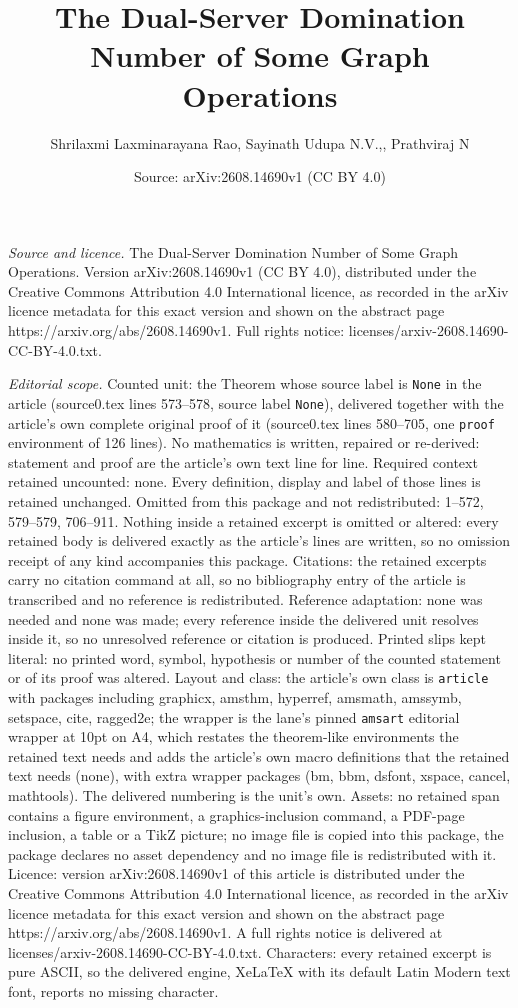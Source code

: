 \documentclass[10pt,a4paper]{amsart}
\title[The Dual-Server Domination Number of Some Graph Operations]{The Dual-Server Domination Number of Some Graph Operations}
\author{Shrilaxmi Laxminarayana Rao, Sayinath Udupa N.V.,, Prathviraj N}
\date{Source: arXiv:2608.14690v1 (CC BY 4.0)}
\begin{document}
\maketitle

\noindent\emph{Source and licence.} The Dual-Server Domination Number of Some Graph Operations. Version arXiv:2608.14690v1 (CC BY 4.0), distributed under the Creative Commons Attribution 4.0 International licence, as recorded in the arXiv licence metadata for this exact version and shown on the abstract page https://arxiv.org/abs/2608.14690v1. Full rights notice: licenses/arxiv-2608.14690-CC-BY-4.0.txt.\par\smallskip

\noindent\textit{Editorial scope.} Counted unit: the Theorem whose source label is \texttt{None} in the article (source0.tex lines 573--578, source label \texttt{None}), delivered together with the article's own complete original proof of it (source0.tex lines 580--705, one \texttt{proof} environment of 126 lines). No mathematics is written, repaired or re-derived: statement and proof are the article's own text line for line. Required context retained uncounted: none. Every definition, display and label of those lines is retained unchanged. Omitted from this package and not redistributed: 1--572, 579--579, 706--911. Nothing inside a retained excerpt is omitted or altered: every retained body is delivered exactly as the article's lines are written, so no omission receipt of any kind accompanies this package. Citations: the retained excerpts carry no citation command at all, so no bibliography entry of the article is transcribed and no reference is redistributed. Reference adaptation: none was needed and none was made; every reference inside the delivered unit resolves inside it, so no unresolved reference or citation is produced. Printed slips kept literal: no printed word, symbol, hypothesis or number of the counted statement or of its proof was altered. Layout and class: the article's own class is \texttt{article} with packages including graphicx, amsthm, hyperref, amsmath, amssymb, setspace, cite, ragged2e; the wrapper is the lane's pinned \texttt{amsart} editorial wrapper at 10pt on A4, which restates the theorem-like environments the retained text needs and adds the article's own macro definitions that the retained text needs (none), with extra wrapper packages (bm, bbm, dsfont, xspace, cancel, mathtools). The delivered numbering is the unit's own. Assets: no retained span contains a figure environment, a graphics-inclusion command, a PDF-page inclusion, a table or a TikZ picture; no image file is copied into this package, the package declares no asset dependency and no image file is redistributed with it. Licence: version arXiv:2608.14690v1 of this article is distributed under the Creative Commons Attribution 4.0 International licence, as recorded in the arXiv licence metadata for this exact version and shown on the abstract page https://arxiv.org/abs/2608.14690v1. A full rights notice is delivered at licenses/arxiv-2608.14690-CC-BY-4.0.txt. Characters: every retained excerpt is pure ASCII, so the delivered engine, XeLaTeX with its default Latin Modern text font, reports no missing character.
\end{document}
